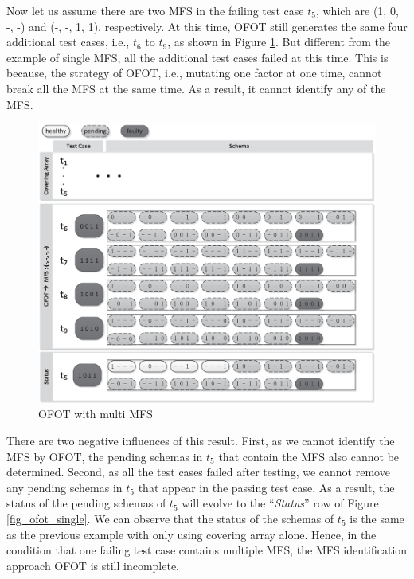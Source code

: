 Now let us assume there are two MFS in the failing test case $t_{5}$, which are (1, 0, -, -) and (-, -, 1, 1), respectively. At this time, OFOT still generates the same four additional test cases, i.e., $t_{6}$ to $t_{9}$,  as shown in Figure \ref{fig_ofot_multi}. But different from the example of single MFS,  all the additional test cases failed at this time. This is because, the strategy of OFOT, i.e., mutating one factor at one time, cannot break all the MFS at the same time. As a result, it cannot identify any of the MFS.
\begin{figure}[ht]
 \centering
 \includegraphics[width=5.6in]{ofot_multi.eps}
 \caption{OFOT with multi MFS}
 \label{fig_ofot_multi}
\end{figure}

There are two negative influences of this result. First, as we cannot identify the MFS by OFOT, the pending schemas in $t_{5}$ that contain the MFS also cannot be determined. Second, as all the test cases failed after testing, we cannot remove any pending schemas in $t_{5}$ that appear in the passing test case. As a result, the status of the pending schemas of $t_{5}$ will evolve to the ``\emph{Status}'' row of Figure \ref{fig_ofot_single}. We can observe that the status of the schemas of $t_{5}$ is the same as the previous example with only using covering array alone. Hence, in the condition that one failing test case contains multiple MFS, the MFS identification approach OFOT is still incomplete.


